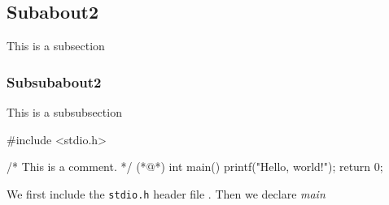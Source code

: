 \subsection{Subabout2}
This is a subsection

\subsubsection{Subsubabout2}
This is a subsubsection

\begin{Sourcecode}[caption=test]
#include <stdio.h>
	 
/* This is a comment. */
(*@\lnote@*) int main() {
    printf("Hello, world!\n");
    return 0;
}
\end{Sourcecode}
We first include the \texttt{stdio.h} header file .
Then we declare \textit{main} %
